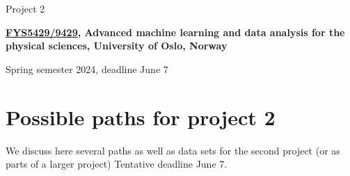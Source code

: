 \documentclass[%
oneside,                 %
final,                   %
10pt]{article}
\begin{document}

\newcommand{\exercisesection}[1]{\subsection*{#1}}






\thispagestyle{empty}

\begin{center}
{\LARGE\bf
\begin{spacing}{1.25}
Project 2
\end{spacing}
}
\end{center}


\begin{center}
{\bf \href{{https://www.uio.no/studier/emner/matnat/fys/FYS5429/index-eng.html}}{FYS5429/9429}, Advanced machine learning and data analysis for the physical sciences, University of Oslo, Norway${}^{}$} \\ [0mm]
\end{center}

\begin{center}
\end{center}
    

\begin{center}
Spring semester 2024, deadline June 7
\end{center}

\vspace{1cm}


\section*{Possible paths for project 2}

We discuss here several paths as well as data sets for the second project (or as parts of a larger project)
Tentative deadline June 7.
\end{document}
